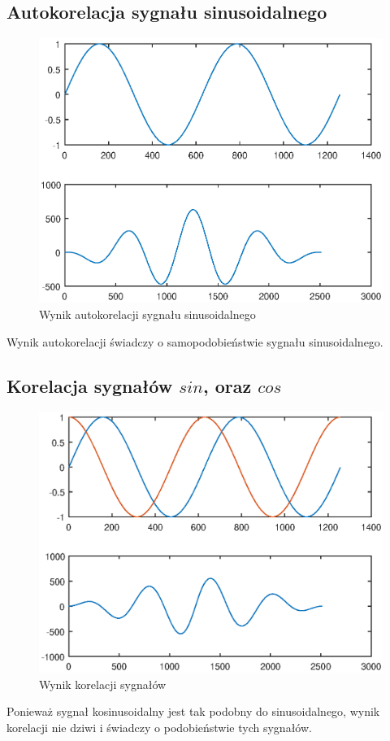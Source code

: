 \documentclass[12pt,titlepage]{report}
\begin{document}
\subsection{Autokorelacja sygnału sinusoidalnego}

\begin{figure}[!h]
	\centering
	\includegraphics[scale=0.7]{../cw53_output}
	\caption{Wynik autokorelacji sygnału sinusoidalnego}
\end{figure}
Wynik autokorelacji świadczy o samopodobieństwie sygnału sinusoidalnego.

\subsection{Korelacja sygnałów $sin$, oraz $cos$}

\begin{figure}[!h]
	\centering
	\includegraphics[scale=0.7]{../cw54_output}
	\caption{Wynik korelacji sygnałów}
\end{figure}
Ponieważ sygnał kosinusoidalny jest tak podobny do sinusoidalnego, wynik korelacji nie dziwi i świadczy o podobieństwie tych sygnałów.
\newpage
\end{document}
